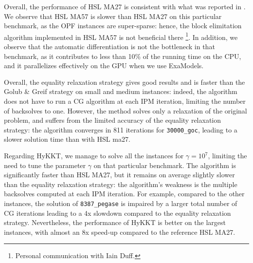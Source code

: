 Overall, the performance of HSL MA27 is consistent with what was reported
in \cite{babaeinejadsarookolaee2019power}. We observe that HSL MA57 is slower
than HSL MA27 on this particular benchmark, as the OPF instances are super-sparse:
hence, the block elimitation algorithm implemented in HSL MA57 is not beneficial there
\footnote{Personal communication with Iain Duff.}. In addition, we observe that
the automatic differentiation is not the bottleneck in that benchmark, as it contributes to less than 10\% of
the running time on the CPU, and it parallelizes effectively on the GPU when we use ExaModels.

Overall, the equality relaxation strategy gives good results and is faster than
the Golub \& Greif strategy on small and medium instances: indeed, the algorithm
does not have to run a CG algorithm at each IPM iteration, limiting the number
of backsolves to one. However, the method solves only a relaxation of the original
problem, and suffers from the limited accuracy of the equality relaxation strategy:
the algorithm converges in 811 iterations for {\tt 30000\_goc}, leading to a slower
solution time than with HSL ma27.

Regarding HyKKT, we manage to solve all the instances for $\gamma = 10^7$, limiting
the need to tune the parameter $\gamma$ on that particular benchmark. The algorithm
is significantly faster than HSL MA27, but it remains on average slightly slower
than the equality relaxation strategy: the algorithm's weakness is the multiple
backsolves computed at each IPM iteration. For example, compared
to the other instances, the solution of {\tt 8387\_pegase} is impaired
by a larger total number of CG iterations leading to a 4x slowdown compared
to the equality relaxation strategy.
Nevertheless, the performance of HyKKT is better on the largest instances,
with almost an 8x speed-up compared to the reference HSL MA27.

